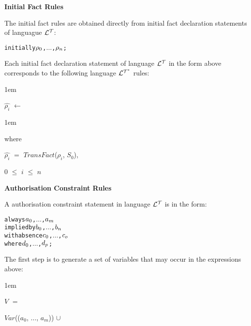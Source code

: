 \documentclass[11pt]{report}
\newenvironment{vverbatim}
{
  \begin{alltt}
}
{
  \vspace{-\baselineskip}
  \end{alltt}
}
\newenvironment{vquote}
{
  \begin{list}{}{\leftmargin 1em}\item[]
}
{
  \end{list}
}
\begin{document}
\begin{itemize}
            \item
              {\bf Initial Fact Rules}

              The initial fact rules are obtained directly from initial fact
              declaration statements of languague ${\cal L^T}$:

              \begin{vverbatim}
  initially \(\rho\sb{0}\), \(\ldots\), \(\rho\sb{n}\);
              \end{vverbatim}

              Each initial fact declaration statement of language ${\cal L^T}$
              in the form above corresponds to the following language
              ${\cal L^{T^*}}$ rules:

              \begin{vquote}
                $\hat{\rho_i}$ $\leftarrow$
              \end{vquote}

              \begin{vquote}
                where

                \hspace{1em}
                $\hat{\rho_i}$ $=$ $TransFact$($\rho_i$, $S_0$),

                \hspace{1em}
                $0$ $\leq$ $i$ $\leq$ $n$
              \end{vquote}

            \item
              {\bf Authorisation Constraint Rules}

              A authorisation constraint statement in language ${\cal L^T}$
              is in the form:

              \begin{vverbatim}
  always \(a\sb{0}\), \(\ldots\), \(a\sb{m}\)
    implied by \(b\sb{0}\), \(\ldots\), \(b\sb{n}\)
    with absence \(c\sb{0}\), \(\ldots\), \(c\sb{o}\)
    where \(d\sb{0}\), \(\ldots\), \(d\sb{p}\);
              \end{vverbatim}

              The first step is to generate a set of variables that may
              occur in the expressions above:

              \begin{vquote}
                $V$ $=$

                \hspace{1em}
                $Var$(($a_0$, $\ldots$, $a_m$)) $\cup$


\end{vquote}
\end{itemize}
\end{document}
